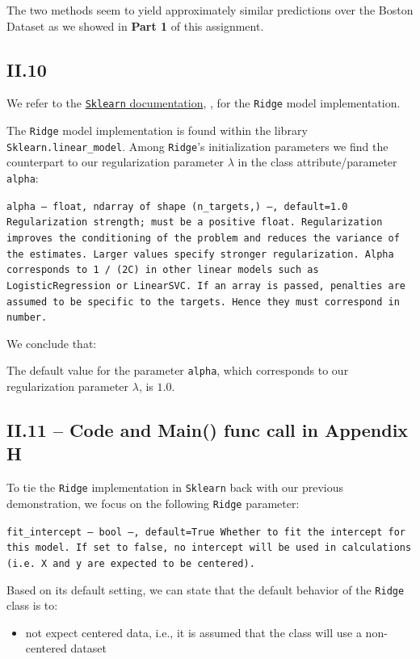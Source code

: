 \documentclass{homework}
\begin{document}
\textcolor{OliveGreen}{The two methods seem to yield approximately similar predictions over the Boston Dataset as we showed in \textbf{Part 1} of this assignment.}

\subsection*{II.10} 

We refer to the \href{https://scikit-learn.org/stable/modules/generated/sklearn.linear_model.Ridge.html#sklearn.linear_model.Ridge}{\texttt{Sklearn} documentation}, 
\cite{sklearn_api}, for the \texttt{Ridge} model implementation.

The \texttt{Ridge} model implementation is found within the library \texttt{Sklearn.linear\_model}. Among \texttt{Ridge}'s initialization 
parameters we find the counterpart to our regularization parameter $\lambda$ in the class attribute/parameter \texttt{alpha}:
\begin{displayquote}
\texttt{alpha -- float, ndarray of shape (n\_targets,) --, default=1.0 \newline Regularization strength; must be a positive float. Regularization 
improves the conditioning of the problem and reduces the variance of the estimates. Larger values specify stronger regularization. Alpha corresponds 
to 1 / (2C) in other linear models such as LogisticRegression or LinearSVC. If an array is passed, penalties are assumed to be specific to the 
targets. Hence they must correspond in number.}
\end{displayquote}

We conclude that:

\textcolor{OliveGreen}{The default value for the parameter \texttt{alpha}, which corresponds to our regularization parameter $\lambda$, is $1.0$.}

\subsection*{II.11 -- Code and Main() func call in Appendix H} 

To tie the \texttt{Ridge} implementation in \texttt{Sklearn} back with our previous demonstration, we focus on the following \texttt{Ridge} parameter: 
\begin{displayquote}
\texttt{fit\_intercept -- bool --, default=True\newline
Whether to fit the intercept for this model. If set to false, no intercept will be used in calculations (i.e. X and y are expected to be centered).}
\end{displayquote}
Based on its default setting, we can state that the default behavior of the \texttt{Ridge} class is to:
\begin{itemize}
    \item not expect centered data, i.e., it is assumed that the class will use a non-centered dataset
\end{itemize}
\end{document}
